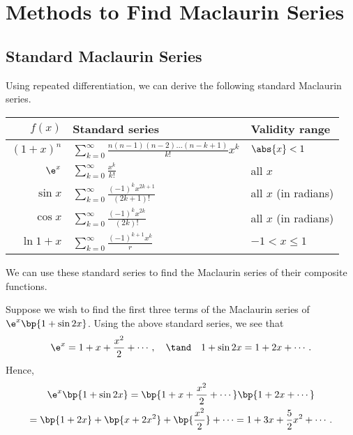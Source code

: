 \section{Methods to Find Maclaurin Series}

\subsection{Standard Maclaurin Series}

Using repeated differentiation, we can derive the following standard Maclaurin series.

\begin{table}[H]
    \centering
    \begin{tabular}{|rll|}
    \hline
    $f(x)$ & \textbf{Standard series} & \textbf{Validity range} \\ \hline\hline
    $(1+x)^n$ & $\displaystyle\sum_{k = 0}^\infty \frac{n(n-1)(n-2)\dots(n-k+1)}{k!} x^k$ & $\abs{x} < 1$ \\
    $\e^x$ & $\displaystyle \sum_{k = 0}^\infty \frac{x^k}{k!}$ & all $x$ \\
    $\sin x$ & $\displaystyle \sum_{k = 0}^\infty \frac{(-1)^k x^{2k+1}}{(2k+1)!}$ & all $x$ (in radians) \\
    $\cos x$ & $\displaystyle \sum_{k = 0}^\infty \frac{(-1)^k x^{2k}}{(2k)!}$ & all $x$ (in radians) \\
    $\ln{1 + x}$ & $\displaystyle \sum_{k = 0}^\infty \frac{(-1)^{k + 1} x^k}{r}$ & $-1 < x \leq 1$ \\ \hline
    \end{tabular}
\end{table}

We can use these standard series to find the Maclaurin series of their composite functions.

\begin{example}
    Suppose we wish to find the first three terms of the Maclaurin series of $\e^x \bp{1 + \sin 2x}$. Using the above standard series, we see that \[\e^x = 1 + x + \frac{x^2}{2} + \cdots, \quad \tand \quad 1 + \sin 2x = 1 + 2x + \cdots.\] Hence,
    \begin{gather*}
        \e^x \bp{1 + \sin 2x} = \bp{1 + x + \frac{x^2}{2} + \cdots}\bp{1 + 2x + \cdots}\\
        = \bp{1 + 2x} + \bp{x + 2x^2} + \bp{\frac{x^2}{2}} + \cdots = 1 + 3x + \frac52 x^2 + \cdots.
    \end{gather*}
\end{example}

